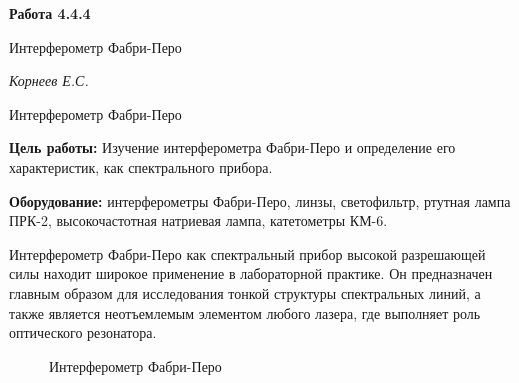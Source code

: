 \documentclass[14pt]{article}
\begin{document}
\begin{titlepage}
	\begin{center}
		\fontsize{18pt}{20pt}\selectfont
		\textbf{Работа 4.4.4}
	
		\vspace{5cm}
		\fontsize{24pt}{25pt}\selectfont
		Интерферометр Фабри-Перо
	\end{center}
	\begin{flushright}
		\fontsize{18pt}{20pt}\selectfont
		\vspace{14cm}
		\hspace{-3cm}
		\textit{Корнеев Е.С.}
	\end{flushright}		
\end{titlepage}

\begin{center}
	\fontsize{16pt}{18pt}\selectfont	
	Интерферометр Фабри-Перо
\end{center}


\fontsize{14pt}{16pt}\selectfont
\vspace{1cm}
\textbf{Цель работы:} Изучение интерферометра Фабри-Перо и определение
его характеристик, как спектрального прибора.

\vspace{0.5cm}
\textbf{Оборудование:} интерферометры Фабри-Перо, линзы, светофильтр,
ртутная лампа ПРК-2, высокочастотная натриевая лампа,
катетометры КМ-6. 

\vspace{0.5cm}
Интерферометр Фабри-Перо как спектральный прибор высокой разрешающей
силы находит широкое применение в лабораторной практике.
Он предназначен главным образом для исследования тонкой структуры
спектральных линий, а также является неотъемлемым элементом любого
лазера, где выполняет роль оптического резонатора.

\begin{figure}[H]
	\caption{Интерферометр Фабри-Перо}
	\label{fig:image}
\end{figure}
\end{document}
